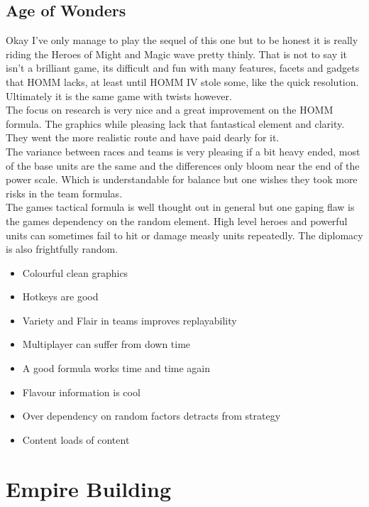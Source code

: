\documentclass[a4paper]{article}
\begin{document}
\subsection{Age of Wonders}
Okay I've only manage to play the sequel of this one but to be honest it is really riding the Heroes of Might and Magic wave pretty thinly. That is not to say it isn't a brilliant game, its difficult and fun with many features, facets and gadgets that HOMM lacks, at least until HOMM IV stole some, like the quick resolution. Ultimately it is the same game with twists however.\\
The focus on research is very nice and a great improvement on the HOMM formula. The graphics while pleasing lack that fantastical element and clarity. They went the more realistic route and have paid dearly for it.\\
The variance between races and teams is very pleasing if a bit heavy ended, most of the base units are the same and the differences only bloom near the end of the power scale. Which is understandable for balance but one wishes they took more risks in the team formulas.\\
The games tactical formula is well thought out in general but one gaping flaw is the games dependency on the random element. High level heroes and powerful units can sometimes fail to hit or damage measly units repeatedly. The diplomacy is also frightfully random. \\

\begin{itemize}
\item Colourful clean graphics
\item Hotkeys are good
\item Variety and Flair in teams improves replayability
\item Multiplayer can suffer from down time
\item A good formula works time and time again
\item Flavour information is cool
\item Over dependency on random factors detracts from strategy
\item Content loads of content
\end{itemize}

\section{Empire Building}
\end{document}

